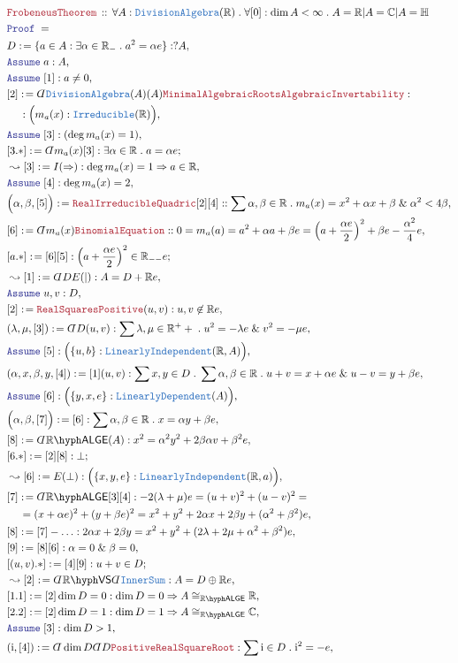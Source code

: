 \documentclass[12pt]{scrartcl}%
\newcommand{\TYPE}[1]{\textcolor{NavyBlue}{\mathtt{#1}}}%
\newcommand{\LOGIC}[1]{\textcolor{Blue}{\mathtt{#1}}}%
\newcommand{\THM}[1]{\textcolor{Maroon}{\mathtt{#1}}}%
\renewcommand{\.}{\; . \;} %
\newcommand{\de}{: \kern 0.1pc =} %
\newcommand{\Theorem}[2]{& \THM{#1} \, :: \, #2 \\ & \Proof = \\ } %
\newcommand{\NewLine}{\\ & \kern 1pc}%
\newcommand{\Page}[1]{ \begin{align*} #1 \end{align*}  }%
\newcommand{ \bd }{ \ByDef }%
\renewcommand{\And}{\; \& \;}%
\newcommand{\Reals}{\mathbb{R}}%
\newcommand{\Complex}{\mathbb{C}}%
\newcommand{\Quat}{\mathbb{H}}%
\newcommand{\Say}[3]{& #1 \de #2 : #3, \\} %
\newcommand{\Conclude}[3]{& #1 \de #2 : #3; \\}%
\newcommand{\Derive}[3]{& \leadsto #1 \de #2 : #3, \\} %
\newcommand{\Assume}[2]{& \LOGIC{Assume} \; #1 : #2, \\} %
\newcommand{\ByDef}{\rotatebox[origin=c]{-180}{$D$}}%
\newcommand{\Proof}{\LOGIC{Proof} \; } %
\newcommand{\LI}{\TYPE{LinearlyIndependent}}
\newcommand{\VS}[1]{#1\hyph\mathsf{VS}} %
\newcommand{\LALGE}[1]{#1\hyph\mathsf{ALGE}}%
\begin{document}
\Page{
	\Theorem{FrobeneusTheorem}{ \forall A : \TYPE{DivisionAlgebra}(\Reals) \. \forall [0] : \dim A < \infty \.   A = \Reals | A = \Complex | A = \Quat  }
	\Say{D}{\{a \in A : \exists \alpha \in \Reals_{-} \. a^2 = \alpha e \}}{?A}
	\Assume{a}{A}
	\Assume{[1]}{a \neq 0}
	\Say{[2]}{\bd \TYPE{DivisionAlgebra}(A)(A)\THM{MinimalAlgebraicRoots}\THM{AlgebraicInvertability}}{ \NewLine : \Big( m_a(x) : \TYPE{Irreducible}(\Reals)  \Big)}
	\Assume{[3]}{(\deg m_a(x) = 1)}
	\Conclude{[3.*]}{\bd m_a(x) [3]}{ \exists \alpha \in \Reals \. a = \alpha e}
	\Derive{[3]}{I(\Rightarrow)}{\deg m_a(x) = 1 \Rightarrow a \in \Reals }
	\Assume{[4]}{\deg m_a(x) = 2}
	\Say{\Big( \alpha ,\beta ,[5]\Big)}{\THM{RealIrreducibleQuadric}[2][4]}{  :  \sum \alpha,\beta \in \Reals \. m_a(x) = x^2 + \alpha x + \beta  \And \alpha^2 < 4 \beta}
	\Say{[6]}{\bd m_a(x) \THM{BinomialEquation}}{ : 0 = m_a(a) = a^2 + \alpha a + \beta e = \left(a + \frac{\alpha e}{2}\right)^2 + \beta e - \frac{\alpha^2}{4} e }
	\Conclude{[a.*]}{[6][5]}{ \left(a + \frac{\alpha e}{2} \right)^2 \in \Reals_{--}e   } 
	\Derive{[1]}{\bd D E(|)}{ A = D + \Reals e}
	\Assume{u,v}{D}
	\Say{[2]}{ \THM{RealSquaresPositive}(u,v) }{ u,v \not \in \Reals e    }
	\Say{(\lambda,\mu,[3])}{\bd D(u,v)}{\sum \lambda,\mu \in \Reals^++ \. u^2 = -\lambda e \And v^2 = - \mu e }
	\Assume{[5]}{\Big( \{u,b\} : \LI(\Reals,A) \Big)}
	\Say{(\alpha,x,\beta,y,[4])}{[1](u,v)}{ \sum x,y \in D \. \sum \alpha,\beta \in \Reals \. u + v = x + \alpha e \And u - v = y + \beta e }
	\Assume{[6]}{\Big( \{  y,x,e \} : \TYPE{LinearlyDependent}(A)  \Big)}
	\Say{\Big(\alpha,\beta,[7]\Big)}{ [6]  }{\sum \alpha,\beta \in \Reals \.  x = \alpha y + \beta e}
	\Say{[8]}{ \bd \LALGE{\Reals}(A) }{ x^2 = \alpha^2 y^2 + 2\beta \alpha v + \beta^2 e}
	\Conclude{[6.*]}{[2][8] }{ \bot  }
	\Derive{[6]}{E(\bot)}{ \Big( \{ x,y,e\} : \LI(\Reals,a)  \Big) }
	\Say{[7]}{\bd \LALGE{\Reals}[3][4]}{  -2(\lambda + \mu)e = (u+v)^2 + (u-v)^2 =  \NewLine = (x + \alpha e)^2 + (y + \beta  e)^2 = x^2 + y^2 + 2 \alpha  x +  2  \beta y   + (\alpha^2 + \beta^2)e      }
	\Say{[8]}{[7] - \ldots}{  2 \alpha x + 2 \beta y =  x^2 + y^2 + (2\lambda + 2\mu + \alpha^2 + \beta^2  )e       } 
	\Say{[9]}{[8][6]}{\alpha = 0 \And \beta = 0}
	\Conclude{[(u,v).*]}{ [4][9]}{u+v \in D}
	\Derive{[2]}{\bd \VS{\Reals}\bd \TYPE{InnerSum}}{  A = D \oplus \Reals e  }
	\Say{[1.1]}{[2]\dim D = 0}{  \dim D = 0 \Rightarrow A \cong_{\LALGE{\Reals}} \Reals }
	\Say{[2.2]}{[2]\dim D = 1}{  \dim D = 1 \Rightarrow A \cong_{\LALGE{\Reals}} \Complex }
	\Assume{[3]}{\dim D > 1}
	\Say{(\mathrm{i},[4])}{\bd \dim D \bd D \THM{PositiveRealSquareRoot}}{\sum \mathrm{i} \in D \. \mathrm{i}^2 = -e }
}
\end{document}
